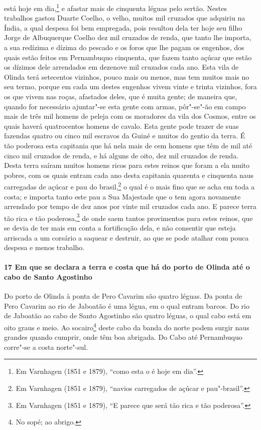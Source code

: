 está hoje em dia,\footnote{ Em Varnhagen (1851 e 1879), ``como esta o é hoje em dia''.} e
afastar mais de cinquenta léguas pelo sertão. Nestes trabalhos gastou Duarte Coelho, o
velho, muitos mil cruzados que adquiriu na Índia, a qual despesa foi bem empregada, pois
resultou dela ter hoje seu filho Jorge de Albuquerque Coelho dez mil cruzados de renda,
que tanto lhe importa, a sua redízima e dízima do pescado e os foros que lhe pagam os
engenhos, dos quais estão feitos em Pernambuquo cinquenta, que fazem tanto açúcar que
estão os dízimos dele arrendados em dezenove mil cruzados cada ano. Esta vila de Olinda
terá setecentos vizinhos, pouco mais ou menos, mas tem muitos mais no seu termo, porque em
cada um destes engenhos vivem vinte e trinta vizinhos, fora os que vivem nas roças,
afastados deles, que é muita gente; de maneira que, quando for necessário ajuntar"-se esta
gente com armas, pôr"-se"-ão em campo mais de três mil homens de peleja com os moradores da
vila dos Cosmos, entre os quais haverá quatrocentos homens de cavalo. Esta gente pode
trazer de suas fazendas quatro ou cinco mil escravos da Guiné e muitos do gentio da terra.
É tão poderosa esta capitania que há nela mais de cem homens que têm de mil até cinco mil
cruzados de renda, e há alguns de oito, dez mil cruzados de renda. Desta terra saíram
muitos homens ricos para estes reinos que foram a ela muito pobres, com os quais entram
cada ano desta capitania quarenta e cinquenta naus carregadas de açúcar e pau do
brasil,\footnote{ Em Varnhagen (1851 e 1879), ``navios carregados de açúcar e
pau"-brasil''.} o qual é o mais fino que se acha em toda a costa; e importa tanto este pau
a Sua Majestade que o tem agora novamente arrendado por tempo de dez anos por vinte mil
cruzados cada ano. E parece terra tão rica e tão poderosa,\footnote{ Em Varnhagen (1851 e
1879), ``E parece que será tão rica e tão poderosa''.} de onde saem tantos provimentos
para estes reinos, que se devia de ter mais em conta a fortificação dela, e não consentir
que esteja arriscada a um corsário a saquear e destruir, ao que se pode atalhar com pouca
despesa e menos trabalho.

\paragraph{17 Em que se declara a terra e costa que há do porto de Olinda até o cabo de
Santo Agostinho}

Do porto de Olinda à ponta de Pero Cavarim são quatro léguas. Da ponta de Pero Cavarim ao
rio de Jaboatão é uma légua, em o qual entram barcos. Do rio de Jaboatão ao cabo de Santo
Agostinho são quatro léguas, o qual cabo está em oito graus e meio. Ao socairo\footnote{
No sopé; ao abrigo.} deste cabo da banda do norte podem surgir naus grandes quando
cumprir, onde têm boa abrigada. Do Cabo até Pernambuquo corre"-se a costa norte"-sul.

